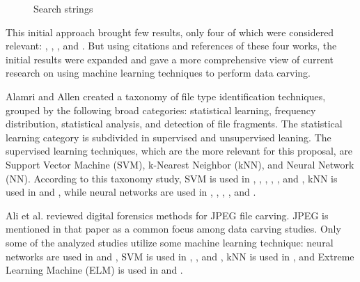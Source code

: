\begin{figure}[!ht]
  \centering
  \caption{Search strings}
  \label{fig:datasearchstring}
\end{figure}


This initial approach brought few results, only four of which were considered relevant: \cite{alamri_taxonomy_2014}, 
\cite{ali_review_2018}, \cite{sportiello_context-based_2012}, and \cite{beebe_sceadan:_2013}. But using citations and references of these four works, the initial results were expanded and gave a more comprehensive view of current research on using machine learning techniques to perform data carving.

Alamri and Allen \cite{alamri_taxonomy_2014} created a taxonomy of file type identification techniques, grouped by the following broad categories: statistical learning, frequency distribution, statistical analysis, and detection of file fragments. The statistical learning category is subdivided in supervised and unsupervised leaning. The supervised learning techniques, which are the more relevant for this proposal, are Support Vector Machine (SVM), k-Nearest Neighbor (kNN), and Neural Network (NN). According to this taxonomy study, SVM is used in \cite{ahmed_fast_2011}, \cite{amirani_feature-based_2013}, \cite{beebe_sceadan:_2013}, \cite{fitzgerald_using_2012}, \cite{gopal_statistical_2011}, and \cite{sportiello_context-based_2012}, kNN is used in \cite{ahmed_fast_2011} and \cite{gopal_statistical_2011}, while neural networks are used in \cite{ahmed_fast_2011}, \cite{ahmed_content-based_2010}, \cite{amirani_new_2008}, \cite{amirani_feature-based_2013}, and \cite{penrose_approaches_2013}.

Ali et al. \cite{ali_review_2018} reviewed digital forensics methods for JPEG file carving. JPEG is mentioned in that paper as a common focus among data carving studies. Only some of the analyzed studies utilize some machine learning technique:
neural networks are used in \cite{xu_reassembling_2009} and \cite{amirani_feature-based_2013},
SVM is used in \cite{qiu_new_2014}, \cite{zhang_svm_2016}, and \cite{sportiello_file_2011},
kNN is used in \cite{axelsson_normalised_2010},
and Extreme Learning Machine (ELM) is used in \cite{zhang_svm_2016} and \cite{ali_classification_2018}.



